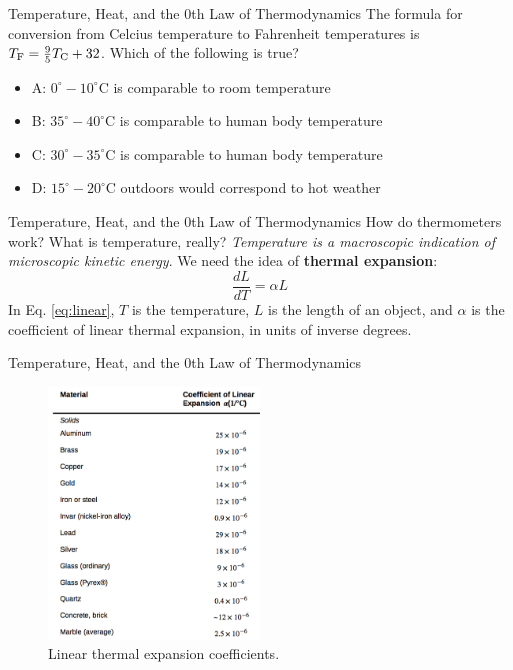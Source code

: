 \documentclass{beamer}
\begin{document}
\begin{frame}{Temperature, Heat, and the 0th Law of Thermodynamics}
The formula for conversion from Celcius temperature to Fahrenheit temperatures is $T_{\rm F} = \frac{9}{5}T_{\rm C} + 32$.  Which of the following is true?
\begin{itemize}
\item A: $0^{\circ}-10^{\circ}$C is comparable to room temperature
\item B: $35^{\circ}-40^{\circ}$C is comparable to human body temperature
\item C: $30^{\circ}-35^{\circ}$C is comparable to human body temperature
\item D: $15^{\circ}-20^{\circ}$C outdoors would correspond to hot weather
\end{itemize}
\end{frame}

\begin{frame}{Temperature, Heat, and the 0th Law of Thermodynamics}
How do thermometers work?  What is temperature, really?  \textit{Temperature is a macroscopic indication of microscopic kinetic energy}.  We need the idea of \textbf{thermal expansion}: \\ 
\begin{equation}
\frac{dL}{dT} = \alpha L
\label{eq:linear}
\end{equation}
In Eq. \ref{eq:linear}, $T$ is the temperature, $L$ is the length of an object, and $\alpha$ is the coefficient of linear thermal expansion, in units of inverse degrees.
\end{frame}

\begin{frame}{Temperature, Heat, and the 0th Law of Thermodynamics}
\begin{figure}
\centering
\includegraphics[width=0.5\textwidth]{figures/linear.png}
\caption{\label{fig:linear} Linear thermal expansion coefficients.}
\end{figure}
\end{frame}
\end{document}
